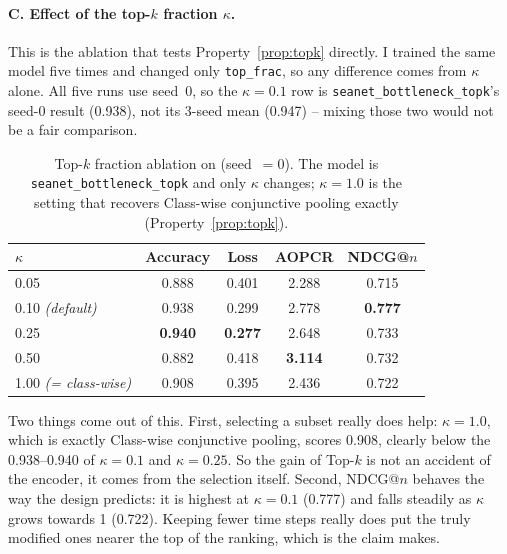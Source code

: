 \paragraph{C. Effect of the top-$k$ fraction $\kappa$.}
This is the ablation that tests Property~\ref{prop:topk} directly. I trained the same model five
times and changed only \texttt{top\_frac}, so any difference comes from $\kappa$ alone. All five
runs use seed~0, so the $\kappa = 0.1$ row is
\texttt{seanet\_bottleneck\_topk}'s seed-0 result (0.938), not its 3-seed mean (0.947) -- mixing
those two would not be a fair comparison.

\begin{table}[htbp]
\caption{Top-$k$ fraction ablation on \webtraffic{} (seed~$=0$). The model is
\texttt{seanet\_bottleneck\_topk} and only $\kappa$ changes; $\kappa = 1.0$ is the setting that
recovers Class-wise conjunctive pooling exactly (Property~\ref{prop:topk}).}
\label{tab:ablation_topk}
\begin{center}
\small
\begin{tabular}{lcccc}
\toprule
\textbf{$\kappa$} & \textbf{Accuracy} & \textbf{Loss} & \textbf{AOPCR} & \textbf{NDCG@$n$} \\
\midrule
0.05                    & 0.888 & 0.401 & 2.288 & 0.715 \\
0.10 \emph{(default)}   & 0.938 & 0.299 & 2.778 & \textbf{0.777} \\
0.25                    & \textbf{0.940} & \textbf{0.277} & 2.648 & 0.733 \\
0.50                    & 0.882 & 0.418 & \textbf{3.114} & 0.732 \\
1.00 \emph{(= class-wise)} & 0.908 & 0.395 & 2.436 & 0.722 \\
\bottomrule
\end{tabular}
\end{center}
\end{table}

Two things come out of this. First, selecting a subset really does help:
$\kappa = 1.0$, which is exactly Class-wise conjunctive pooling, scores 0.908, clearly below the
0.938--0.940 of $\kappa = 0.1$ and $\kappa = 0.25$. So the gain of Top-$k$ is not an accident of
the encoder, it comes from the selection itself. Second, NDCG@$n$ behaves the way the design
predicts: it is highest at $\kappa = 0.1$ (0.777) and falls steadily as $\kappa$ grows towards 1
(0.722). Keeping fewer time steps really does put the truly modified ones nearer the top of the
ranking, which is the claim  makes.

